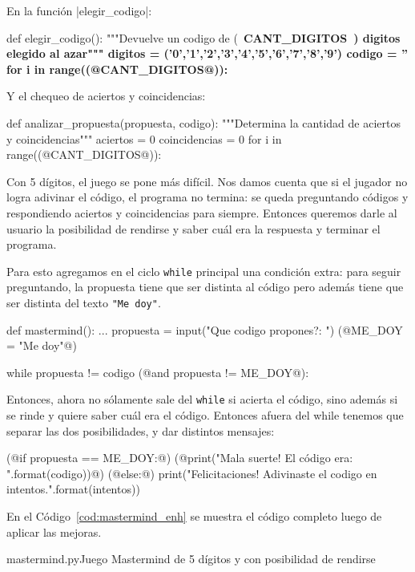 \begin{enumerate}
En la función |elegir_codigo|:

\begin{codigo-python-sn}
def elegir_codigo():
    """Devuelve un codigo de (~\bfseries{CANT\_DIGITOS}~) digitos elegido al azar"""
    digitos = ('0','1','2','3','4','5','6','7','8','9')
    codigo = ''
    for i in range((@CANT_DIGITOS@)):
\end{codigo-python-sn}

Y el chequeo de aciertos y coincidencias:

\begin{codigo-python-sn}
def analizar_propuesta(propuesta, codigo):
    """Determina la cantidad de aciertos y coincidencias"""
    aciertos = 0
    coincidencias = 0
    for i in range((@CANT_DIGITOS@)):
\end{codigo-python-sn}

Con 5 dígitos, el juego se pone más difícil. Nos damos cuenta que si el jugador
no logra adivinar el código, el programa no termina: se queda preguntando
códigos y respondiendo aciertos y coincidencias para siempre. Entonces queremos
darle al usuario la posibilidad de rendirse y saber cuál era la respuesta y
terminar el programa.

Para esto agregamos en el ciclo \lstinline!while! principal una condición
extra: para seguir preguntando, la propuesta tiene que ser distinta al
código pero además tiene que ser distinta del texto \lstinline!"Me doy"!.

\begin{codigo-python-sn}
def mastermind():
    ...
    propuesta = input("Que codigo propones?: ")
    (@ME_DOY = "Me doy"@)

    while propuesta != codigo (@and propuesta != ME_DOY@):
\end{codigo-python-sn}

Entonces, ahora no sólamente sale del \lstinline!while! si acierta el
código, sino además si se rinde y quiere saber cuál era el código. Entonces
afuera del while tenemos que separar las dos posibilidades, y dar distintos
mensajes:

\begin{codigo-python-sn}
    (@if propuesta == ME_DOY:@)
        (@print("Mala suerte! El código era: {}".format(codigo))@)
    (@else:@)
        print("Felicitaciones! Adivinaste el codigo en {} intentos.".format(intentos))
\end{codigo-python-sn}

En el Código~\ref{cod:mastermind_enh} se muestra el código completo luego de
aplicar las mejoras.

\begin{codigo}{\label{cod:mastermind_enh} mastermind.py}{Juego Mastermind de 5
    dígitos y con posibilidad de rendirse}

\end{codigo}
\end{enumerate}

